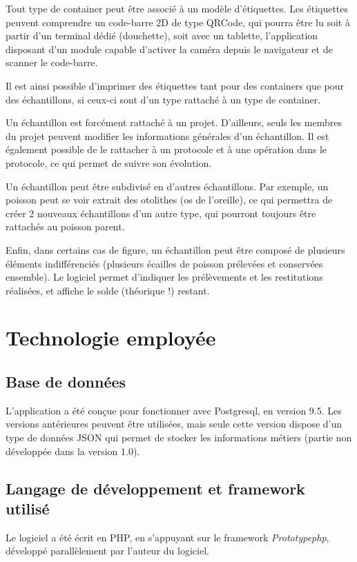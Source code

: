 Tout type de container peut être associé à un modèle d'étiquettes. Les étiquettes peuvent comprendre un code-barre 2D de type QRCode, qui pourra être lu soit à partir d'un terminal dédié (douchette), soit avec un tablette, l'application disposant d'un module capable d'activer la caméra depuis le navigateur et de scanner le code-barre.

Il est ainsi possible d'imprimer des étiquettes tant pour des containers que pour des échantillons, si ceux-ci sont d'un type rattaché à un type de container.

Un échantillon est forcément rattaché à un projet. D'ailleurs, seuls les membres du projet peuvent modifier les informations générales d'un échantillon. 
Il est également possible de le rattacher à un protocole et à une opération dans le protocole, ce qui permet de suivre son évolution.

Un échantillon peut être subdivisé en d'autres échantillons. Par exemple, un poisson peut se voir extrait des otolithes (os de l'oreille), ce qui permettra de créer 2 nouveaux échantillons d'un autre type, qui pourront toujours être rattachés au poisson parent.

Enfin, dans certains cas de figure, un échantillon peut être composé de plusieurs éléments indifférenciés (plusieurs écailles de poisson prélevées et conservées ensemble). Le logiciel permet d'indiquer les prélèvements et les restitutions réalisées, et affiche le solde (théorique !) restant.

\section{Technologie employée}
\subsection{Base de données}

L'application a été conçue pour fonctionner avec Postgresql, en version 9.5. Les versions antérieures peuvent être utilisées, mais seule cette version dispose d'un type de données JSON qui permet de stocker les informations métiers (partie non  développée dans la version 1.0).

\subsection{Langage de développement et framework utilisé}
Le logiciel a été écrit en PHP, en s'appuyant sur le framework \textit{Prototypephp}, développé parallèlement par l'auteur du logiciel.

